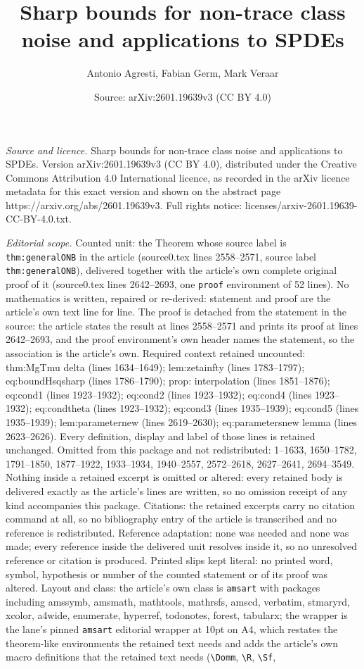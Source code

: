 \documentclass[10pt,a4paper]{amsart}
\title[Sharp bounds for non-trace class noise and applications to S]{Sharp bounds for non-trace class noise and applications to SPDEs}
\author{Antonio Agresti, Fabian Germ, Mark Veraar}
\date{Source: arXiv:2601.19639v3 (CC BY 4.0)}
\begin{document}
\maketitle

\noindent\emph{Source and licence.} Sharp bounds for non-trace class noise and applications to SPDEs. Version arXiv:2601.19639v3 (CC BY 4.0), distributed under the Creative Commons Attribution 4.0 International licence, as recorded in the arXiv licence metadata for this exact version and shown on the abstract page https://arxiv.org/abs/2601.19639v3. Full rights notice: licenses/arxiv-2601.19639-CC-BY-4.0.txt.\par\smallskip

\noindent\textit{Editorial scope.} Counted unit: the Theorem whose source label is \texttt{thm:generalONB} in the article (source0.tex lines 2558--2571, source label \texttt{thm:generalONB}), delivered together with the article's own complete original proof of it (source0.tex lines 2642--2693, one \texttt{proof} environment of 52 lines). No mathematics is written, repaired or re-derived: statement and proof are the article's own text line for line. The proof is detached from the statement in the source: the article states the result at lines 2558--2571 and prints its proof at lines 2642--2693, and the proof environment's own header names the statement, so the association is the article's own. Required context retained uncounted: thm:MgTmu delta (lines 1634--1649); lem:zetainfty (lines 1783--1797); eq:boundHsqsharp (lines 1786--1790); prop: interpolation (lines 1851--1876); eq:cond1 (lines 1923--1932); eq:cond2 (lines 1923--1932); eq:cond4 (lines 1923--1932); eq:condtheta (lines 1923--1932); eq:cond3 (lines 1935--1939); eq:cond5 (lines 1935--1939); lem:parameternew (lines 2619--2630); eq:parametersnew lemma (lines 2623--2626). Every definition, display and label of those lines is retained unchanged. Omitted from this package and not redistributed: 1--1633, 1650--1782, 1791--1850, 1877--1922, 1933--1934, 1940--2557, 2572--2618, 2627--2641, 2694--3549. Nothing inside a retained excerpt is omitted or altered: every retained body is delivered exactly as the article's lines are written, so no omission receipt of any kind accompanies this package. Citations: the retained excerpts carry no citation command at all, so no bibliography entry of the article is transcribed and no reference is redistributed. Reference adaptation: none was needed and none was made; every reference inside the delivered unit resolves inside it, so no unresolved reference or citation is produced. Printed slips kept literal: no printed word, symbol, hypothesis or number of the counted statement or of its proof was altered. Layout and class: the article's own class is \texttt{amsart} with packages including amssymb, amsmath, mathtools, mathrsfs, amscd, verbatim, stmaryrd, xcolor, a4wide, enumerate, hyperref, todonotes, forest, tabularx; the wrapper is the lane's pinned \texttt{amsart} editorial wrapper at 10pt on A4, which restates the theorem-like environments the retained text needs and adds the article's own macro definitions that the retained text needs (\texttt{\textbackslash Domm}, \texttt{\textbackslash R}, \texttt{\textbackslash Sf}, 
\end{document}
